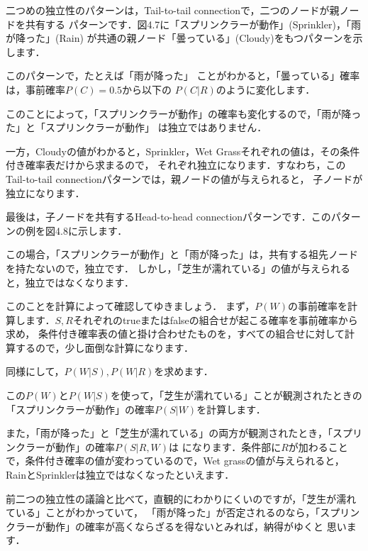 二つめの独立性のパターンは，Tail-to-tail connectionで，二つのノードが親ノードを共有する
パターンです．図4.7に「スプリンクラーが動作」(Sprinkler)，「雨が降った」(Rain)
が共通の親ノード「曇っている」(Cloudy)をもつパターンを示します．


このパターンで，たとえば「雨が降った」 ことがわかると，「曇っている」確率は，事前確率$P(C)=0.5$から以下の
$P(C|R)$のように変化します．


このことによって，「スプリンクラーが動作」の確率も変化するので，「雨が降った」と「スプリンクラーが動作」
は独立ではありません．

一方，Cloudyの値がわかると，Sprinkler，Wet Grassそれぞれの値は，その条件付き確率表だけから求まるので，
それぞれ独立になります．すなわち，このTail-to-tail connectionパターンでは，親ノードの値が与えられると，
子ノードが独立になります．


最後は，子ノードを共有するHead-to-head connectionパターンです．このパターンの例を図4.8に示します．


この場合，「スプリンクラーが動作」と「雨が降った」は，共有する祖先ノードを持たないので，独立です．
しかし，「芝生が濡れている」の値が与えられると，独立ではなくなります．

このことを計算によって確認してゆきましょう．
まず，$P(W)$の事前確率を計算します．$S,R$それぞれのtrueまたはfalseの組合せが起こる確率を事前確率から求め，
条件付き確率表の値と掛け合わせたものを，すべての組合せに対して計算するので，少し面倒な計算になります．


同様にして，$P(W|S), P(W|R)$を求めます．



この$P(W)$と$P(W|S)$を使って，「芝生が濡れている」ことが観測されたときの「スプリンクラーが動作」の確率$P(S|W)$を計算します．


また，「雨が降った」と「芝生が濡れている」の両方が観測されたとき，「スプリンクラーが動作」の確率$P(S|R,W)$は
になります．条件部に$R$が加わることで，条件付き確率の値が変わっているので，Wet grassの値が与えられると，RainとSprinklerは独立ではなくなったといえます．

前二つの独立性の議論と比べて，直観的にわかりにくいのですが，「芝生が濡れている」ことがわかっていて，
「雨が降った」が否定されるのなら，「スプリンクラーが動作」の確率が高くならざるを得ないとみれば，納得がゆくと
思います．



